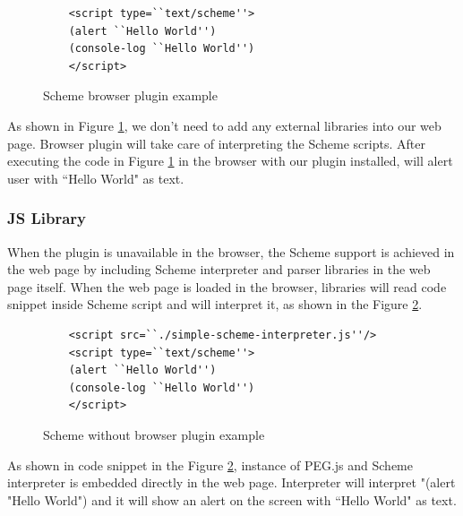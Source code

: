 \begin{figure}[h]
	\begin{lstlisting}  
	<script type=``text/scheme''>
	(alert ``Hello World'')
	(console-log ``Hello World'')
	</script>
	\end{lstlisting}
	\caption{Scheme browser plugin example}
	\label{fig:browserpluginscheme}
\end{figure}


As shown in Figure \ref{fig:browserpluginscheme}, we don't need to add any external libraries into our web page. Browser plugin will take care of interpreting the Scheme scripts. After executing the code in Figure \ref{fig:browserpluginscheme} in the browser with our plugin installed, will alert user with ``Hello World" as text.


\subsubsection{JS Library}

When the plugin is unavailable in the browser, the Scheme support is achieved in the web page by including Scheme interpreter and parser libraries in the web page itself. When the web page is loaded in the browser, libraries will read code snippet inside Scheme script and will interpret it, as shown in the Figure \ref{fig:browserwithoutpluginscheme}. 

\begin{figure}[h]
	\begin{lstlisting} 
	<script src=``./simple-scheme-interpreter.js''/> 
	<script type=``text/scheme''>
	(alert ``Hello World'')
	(console-log ``Hello World'')
	</script>
	\end{lstlisting}
	\caption{Scheme without browser plugin example}
	\label{fig:browserwithoutpluginscheme}
\end{figure}



As shown in code snippet in the Figure \ref{fig:browserwithoutpluginscheme}, instance of PEG.js and Scheme interpreter is embedded directly in the web page. Interpreter will interpret "(alert "Hello World") and it will show an alert on the screen with ``Hello World" as text.